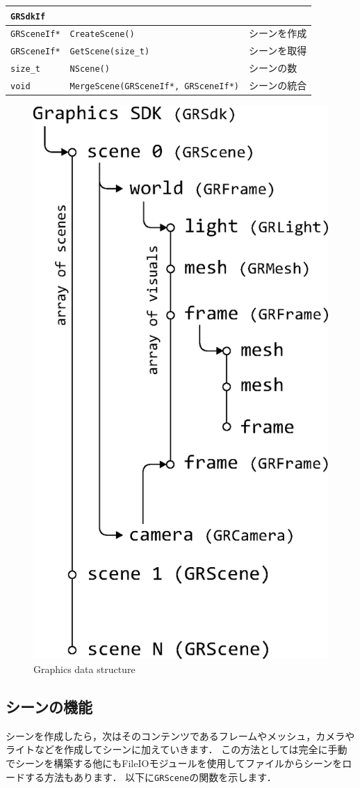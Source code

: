 \begin{center}
\begin{tabular}{p{.15\hsize}p{.50\hsize}p{.25\hsize}}
\texttt{GRSdkIf}	&												&	\\ \midrule
\texttt{GRSceneIf*}	& \texttt{CreateScene()}						& シーンを作成			\\
\texttt{GRSceneIf*}	& \texttt{GetScene(size\_t)}					& シーンを取得			\\
\texttt{size\_t}	& \texttt{NScene()}								& シーンの数			\\
\texttt{void}		& \texttt{MergeScene(GRSceneIf*, GRSceneIf*)}	& シーンの統合			\\
\end{tabular}
\end{center}

\begin{figure}[t]
\begin{center}
\includegraphics[width=.4\hsize]{fig/grscene.eps}
\end{center}
\caption{Graphics data structure}
\label{fig_grscene}
\end{figure}

\subsection*{シーンの機能}

\KLUDGE シーンを作成したら，次はそのコンテンツであるフレームやメッシュ，カメラやライトなどを作成してシーンに加えていきます．
\KLUDGE この方法としては完全に手動でシーンを構築する他にもFileIOモジュールを使用してファイルからシーンをロードする方法もあります．
\KLUDGE 以下に\texttt{GRScene}の関数を示します．

